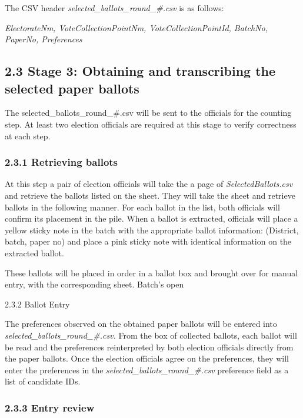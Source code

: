 \documentclass[]{article}
\begin{document}
The CSV header \emph{selected\_ballots\_round\_\#.csv} is as follows:

\emph{ElectorateNm, VoteCollectionPointNm, VoteCollectionPointId,
BatchNo, PaperNo, Preferences}

\subsection{2.3 Stage 3: Obtaining and transcribing the selected paper
ballots}\label{stage-3-obtaining-and-transcribing-the-selected-paper-ballots}

The selected\_ballots\_round\_\#.csv will be sent to the officials for
the counting step. At least two election officials are required at this
stage to verify correctness at each step.

\subsubsection{2.3.1 Retrieving ballots}\label{retrieving-ballots}

At this step a pair of election officials will take the a page of
\emph{SelectedBallots.csv} and retrieve the ballots listed on the sheet.
They will take the sheet and retrieve ballots in the following manner.
For each ballot in the list, both officials will confirm its placement
in the pile. When a ballot is extracted, officials will place a yellow
sticky note in the batch with the appropriate ballot information:
(District, batch, paper no) and place a pink sticky note with identical
information on the extracted ballot.

These ballots will be placed in order in a ballot box and brought over
for manual entry, with the corresponding sheet. Batch's open

\protect\hypertarget{_lba7oli3yiio}{}{}2.3.2 Ballot Entry

The preferences observed on the obtained paper ballots will be entered
into \emph{selected\_ballots\_round\_\#.csv.} From the box of collected
ballots, each ballot will be read and the preferences reinterpreted by
both election officials directly from the paper ballots. Once the
election officials agree on the preferences, they will enter the
preferences in the \emph{selected\_ballots\_round\_\#.csv} preference
field as a list of candidate IDs.

\subsubsection{2.3.3 Entry review}\label{entry-review}
\end{document}
